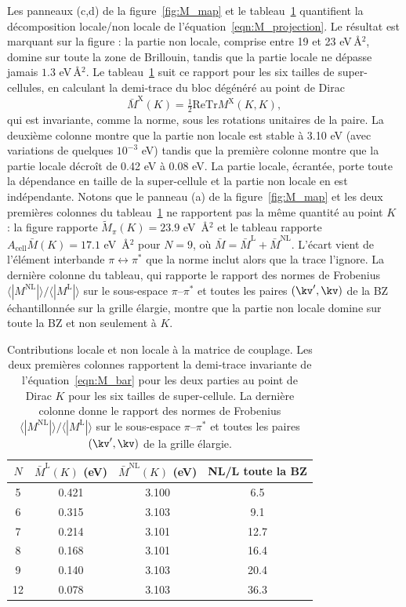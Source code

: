 Les panneaux (c,d) de la figure~\ref{fig:M_map} et le tableau~\ref{tab:L_NL} quantifient la décomposition locale/non locale de l'équation~\eqref{eqn:M_projection}. Le résultat est marquant sur la figure : la partie non locale, comprise entre 19 et 23 eV\,\AA$^2$, domine sur toute la zone de Brillouin, tandis que la partie locale ne dépasse jamais $1.3$ eV\,\AA$^2$. Le tableau~\ref{tab:L_NL}
suit ce rapport pour les six tailles de super-cellules, en calculant la demi-trace du bloc dégénéré au point de Dirac
\begin{equation}
    \bar M^\text{X}(K) = \tfrac{1}{2}\mathrm{Re}\mathrm{Tr}M^\text{X}(K,K),\label{eqn:M_bar}
\end{equation}
qui est invariante, comme la norme, sous les rotations unitaires de la paire. La deuxième colonne montre que la partie non locale est stable à 3.10 eV (avec variations de quelques $10^{-3}$ eV) tandis que la première colonne montre que la partie locale décroît de 0.42 eV à 0.08 eV. La partie locale, écrantée, porte toute la dépendance en taille de la super-cellule et la partie non locale en est indépendante. Notons que le panneau (a) de la figure~\ref{fig:M_map} et les deux premières colonnes du tableau~\ref{tab:L_NL} ne rapportent pas la même quantité au point $K$ : la figure rapporte $ \tilde M_\pi(K)=23.9$ eV~\AA$^2$ et le tableau rapporte $A_\text{cell}\bar M(K)=17.1$ eV~\AA$^2$ pour $N=9$, où $\bar M = \bar M^\text{L}+\bar M^\text{NL}$. L'écart vient de l'élément interbande $\pi\leftrightarrow\pi^*$ que la norme inclut alors que la trace l'ignore. La dernière colonne du tableau, qui rapporte le rapport des normes de Frobenius $\langle |M^\text{NL}|\rangle/\langle |M^\text{L}|\rangle$ sur le sous-espace $\pi$--$\pi^*$ et toutes les paires $(\kv',\kv)$ de la BZ échantillonnée sur la grille élargie, montre que la partie non locale domine sur toute la BZ et non seulement à $K$.
\begin{table}[htbp]
    \centering
    \caption[Contributions locale et non locale
     à la matrice de couplage électron-défaut.]{Contributions locale et non locale à la matrice de couplage. Les deux premières colonnes rapportent la demi-trace invariante de l'équation~\eqref{eqn:M_bar} pour les deux parties au point de Dirac $K$ pour les six tailles de super-cellule. La dernière colonne donne le rapport des normes de Frobenius $\langle |M^\text{NL}|\rangle/\langle |M^\text{L}|\rangle$ sur le sous-espace $\pi$--$\pi^*$ et toutes les paires $(\kv',\kv)$ de la grille élargie.}
    \label{tab:L_NL}
    \begin{tabular}{c c c c}
        \hline\hline
        $N$ & $\bar M^\text{L}(K)$ (eV) & $\bar M^\text{NL}(K)$ (eV) & NL/L toute la BZ \\
        \hline
        5  & 0.421 & 3.100 & 6.5 \\
        6  & 0.315 & 3.103 & 9.1 \\
        7  & 0.214 & 3.101 & 12.7 \\
        8  & 0.168 & 3.101 & 16.4 \\
        9  & 0.140 & 3.103 & 20.4 \\
        12 & 0.078 & 3.103 & 36.3 \\
        \hline\hline
    \end{tabular}
\end{table}
